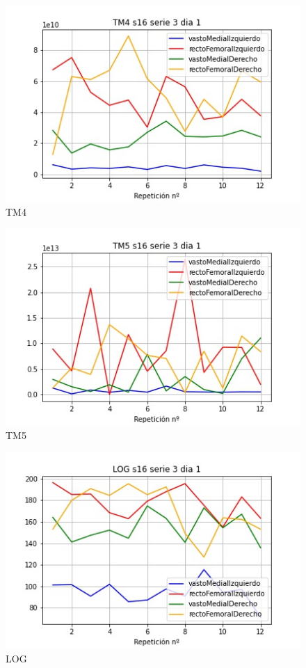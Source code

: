 \begin{figure}[ht]
	\centering
  \includegraphics[width=1.0\textwidth]{imagenes/caracteristicas/TM4 s16 serie 3 dia 1.jpg}
  \caption{ TM4}
  \label{fig:tm4}
\end{figure}
\begin{figure}[ht]
	\centering
  \includegraphics[width=1.0\textwidth]{imagenes/caracteristicas/TM5 s16 serie 3 dia 1.jpg}
  \caption{ TM5}
  \label{fig:tm5}
\end{figure}

\begin{figure}[ht]
	\centering
  \includegraphics[width=1.0\textwidth]{imagenes/caracteristicas/LOG s16 serie 3 dia 1.jpg}
  \caption{ LOG}
  \label{fig:log}
\end{figure}

